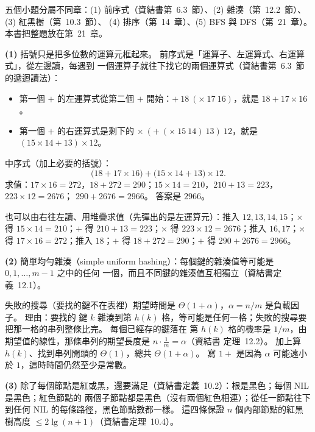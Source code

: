 \begin{pastsoln}
五個小題分屬不同章：(1) 前序式（資結書第~6.3~節）、(2) 雜湊（第~12.2~節）、(3) 紅黑樹（第~10.3~節）、
(4) 排序（第~14~章）、(5) BFS 與 DFS（第~21~章）。 本書把整題放在第~21~章。

\textbf{(1)} 括號只是把多位數的運算元框起來。 前序式是「運算子、左運算式、右運算式」，從左邊讀，每遇到
一個運算子就往下找它的兩個運算式（資結書第~6.3~節的遞迴讀法）：
\begin{itemize}
\item 第一個 $+$ 的左運算式從第二個 $+$ 開始：$+\ 18\ (\times\ 17\ 16)$，就是 $18 + 17 \times 16$。
\item 第一個 $+$ 的右運算式是剩下的 $\times\ (+\ (\times\ 15\ 14)\ 13)\ 12$，就是
$(15 \times 14 + 13) \times 12$。
\end{itemize}
中序式（加上必要的括號）：
\[
\bigl(18 + 17 \times 16\bigr) + \bigl(15 \times 14 + 13\bigr) \times 12 .
\]
求值：$17 \times 16 = 272$，$18 + 272 = 290$；$15 \times 14 = 210$，$210 + 13 = 223$，$223 \times 12 = 2676$；
$290 + 2676 = 2966$。 答案是 $2966$。

也可以由右往左讀、用堆疊求值（先彈出的是左運算元）：推入 $12, 13, 14, 15$；$\times$ 得
$15 \times 14 = 210$；$+$ 得 $210 + 13 = 223$；$\times$ 得 $223 \times 12 = 2676$；推入 $16, 17$；$\times$ 得
$17 \times 16 = 272$；推入 $18$；$+$ 得 $18 + 272 = 290$；$+$ 得 $290 + 2676 = 2966$。

\textbf{(2)} 簡單均勻雜湊（simple uniform hashing）：每個鍵的雜湊值等可能是 $0, 1, \ldots, m-1$ 之中的任何
一個，而且不同鍵的雜湊值互相獨立（資結書定義~12.1）。

失敗的搜尋（要找的鍵不在表裡）期望時間是 $\Theta(1 + \alpha)$，$\alpha = n/m$ 是負載因子。 理由：要找的
鍵 $k$ 雜湊到第 $h(k)$ 格，等可能是任何一格；失敗的搜尋要把那一格的串列整條比完。 每個已經存的鍵落在
第 $h(k)$ 格的機率是 $1/m$，由期望值的線性，那條串列的期望長度是 $n \cdot \frac{1}{m} = \alpha$（資結書
定理~12.2）。 加上算 $h(k)$、找到串列開頭的 $\Theta(1)$，總共 $\Theta(1 + \alpha)$。 寫 $1 +$ 是因為
$\alpha$ 可能遠小於 $1$，這時時間仍然至少是常數。

\textbf{(3)} 除了每個節點是紅或黑，還要滿足（資結書定義~10.2）：根是黑色；每個 NIL 是黑色；紅色節點的
兩個子節點都是黑色（沒有兩個紅色相連）；從任一節點往下到任何 NIL 的每條路徑，黑色節點數都一樣。
這四條保證 $n$ 個內部節點的紅黑樹高度 $\le 2\lg(n+1)$（資結書定理~10.4）。


\end{pastsoln}
